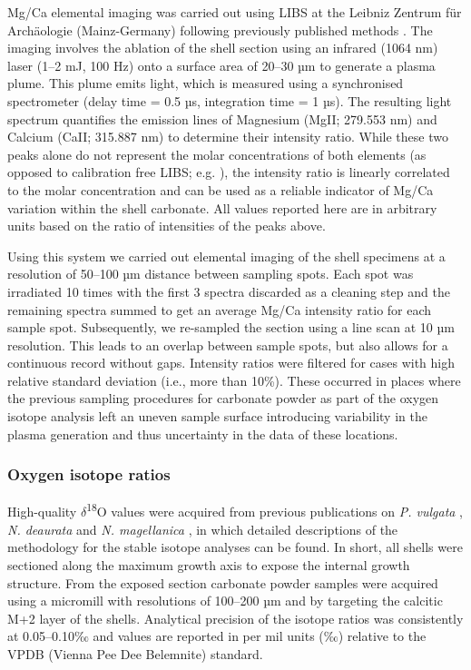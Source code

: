 \documentclass[
  authoryear,
  preprint,
  3p]{elsarticle}
\begin{document}
Mg/Ca elemental imaging was carried out using LIBS at the Leibniz
Zentrum für Archäologie (Mainz-Germany) following previously published
methods \citep{Hausmann2023-ih}. The imaging involves the ablation of
the shell section using an infrared (1064 nm) laser (1--2 mJ, 100 Hz)
onto a surface area of 20--30 µm to generate a plasma plume. This plume
emits light, which is measured using a synchronised spectrometer (delay
time = 0.5 µs, integration time = 1 µs). The resulting light spectrum
quantifies the emission lines of Magnesium (MgII; 279.553 nm) and
Calcium (CaII; 315.887 nm) to determine their intensity ratio. While
these two peaks alone do not represent the molar concentrations of both
elements (as opposed to calibration free LIBS; e.g.
\citep{Martinez-Minchero2022-jz}), the intensity ratio is linearly
correlated to the molar concentration \citep{Hausmann2017-oa} and can be
used as a reliable indicator of Mg/Ca variation within the shell
carbonate. All values reported here are in arbitrary units based on the
ratio of intensities of the peaks above.

Using this system we carried out elemental imaging of the shell
specimens at a resolution of 50--100 µm distance between sampling spots.
Each spot was irradiated 10 times with the first 3 spectra discarded as
a cleaning step and the remaining spectra summed to get an average Mg/Ca
intensity ratio for each sample spot. Subsequently, we re-sampled the
section using a line scan at 10 µm resolution. This leads to an overlap
between sample spots, but also allows for a continuous record without
gaps. Intensity ratios were filtered for cases with high relative
standard deviation (i.e., more than 10\%). These occurred in places
where the previous sampling procedures for carbonate powder as part of
the oxygen isotope analysis left an uneven sample surface introducing
variability in the plasma generation and thus uncertainty in the data of
these locations.

\subsubsection{Oxygen isotope ratios}\label{oxygen-isotope-ratios}

High-quality $\delta$\textsuperscript{18}O values were acquired from
previous publications on \emph{P. vulgata}
\citep{Surge2012-ba, Graniero2017-io}, \emph{N. deaurata} and \emph{N.
magellanica} \citep{Nicastro2020-ih}, in which detailed descriptions of
the methodology for the stable isotope analyses can be found. In short,
all shells were sectioned along the maximum growth axis to expose the
internal growth structure. From the exposed section carbonate powder
samples were acquired using a micromill with resolutions of 100--200 µm
and by targeting the calcitic M+2 layer of the shells. Analytical
precision of the isotope ratios was consistently at 0.05--0.10‰ and
values are reported in per mil units (‰) relative to the VPDB (Vienna
Pee Dee Belemnite) standard.
\end{document}
